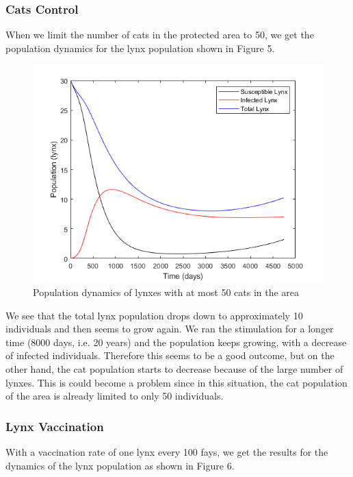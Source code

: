 \documentclass[12pt]{article}
\begin{document}
\subsubsection{Cats Control}
\quad When we limit the number of cats in the protected area to 50, we get the population dynamics for the lynx population shown in Figure 5.

\begin{figure}[!ht]
    \centering
    \includegraphics[scale=0.75]{images/catcontrol.png}
    \caption{Population dynamics of lynxes with at most 50 cats in the area}
    \label{fig:my_label}
\end{figure}

\quad We see that the total lynx population drops down to approximately 10 individuals and then seems to grow again. We ran the stimulation for a longer time (8000 days, i.e. 20 years) and the population keeps growing, with a decrease of infected individuals. Therefore this seems to be a good outcome, but on the other hand, the cat population starts to decrease because of the large number of lynxes. This is could become a problem since in this situation, the cat population of the area is already limited to only 50 individuals.

\subsubsection{Lynx Vaccination}
\quad With a vaccination rate of one lynx every 100 fays, we get the results for the dynamics of the lynx population as shown in Figure 6.
\end{document}
